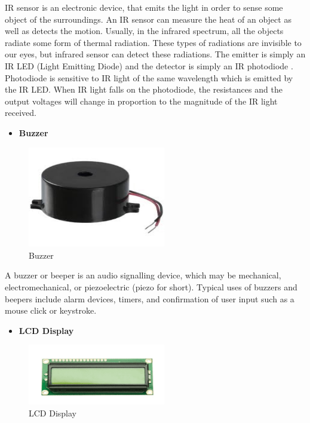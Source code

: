  IR sensor is an electronic device, that emits the light in order to sense some object of the surroundings. An IR sensor can measure the heat of an object as well as detects the motion. Usually, in the infrared spectrum, all the objects radiate some form of thermal radiation. These types of radiations are invisible to our eyes, but infrared sensor can detect these radiations. The emitter is simply an IR LED (Light Emitting Diode) and the detector is simply an IR photodiode . Photodiode is sensitive to IR light of the same wavelength which is emitted by the IR LED. When IR light falls on the photodiode, the resistances and the output voltages will change in proportion to the magnitude of the IR light received.
 
\newpage 
\begin{itemize}
 	\item \Large\textbf {Buzzer}
 \end{itemize}   
  
	\begin{figure}[h]
		\centering
	\includegraphics[width=60mm,scale=1]{45}
	\caption{Buzzer}
	\label{Buzzer}
	
\end{figure}

 A buzzer or beeper is an audio signalling device, which may be mechanical, electromechanical, or piezoelectric (piezo for short). Typical uses of buzzers and beepers include alarm devices, timers, and confirmation of user input such as a mouse click or keystroke.  
 
\newpage
\begin{itemize}
 	\item \Large\textbf {LCD Display}
 \end{itemize}
 
	\begin{figure}[h]
		\centering
	\includegraphics[width=60mm,scale=1]{46}
	\caption{LCD Display}
	\label{LCD Display}
	
\end{figure}

